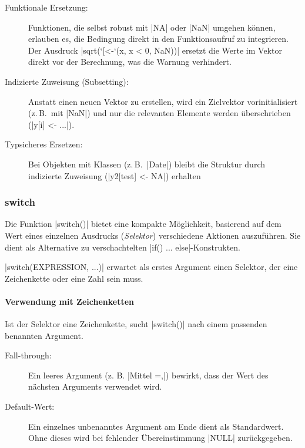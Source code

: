 \documentclass[10pt,twocolumn]{scrartcl}
\renewcommand{\lstinline}{\mycoloredinline}
\begin{document}
\begin{description}
\item[Funktionale Ersetzung:] Funktionen, die selbst robust mit \lstinline|NA| oder \lstinline|NaN| umgehen können, erlauben es, die Bedingung direkt in den Funktionsaufruf zu integrieren. Der Ausdruck \lstinline|sqrt(`[<-`(x, x < 0, NaN))| ersetzt die Werte im Vektor direkt vor der Berechnung, was die Warnung verhindert.
\item[Indizierte Zuweisung (Subsetting):] Anstatt einen neuen Vektor zu erstellen, wird ein Zielvektor vorinitialisiert (z.\,B.\ mit \lstinline|NaN|) und nur die relevanten Elemente werden überschrieben (\lstinline|y[i] <- ...|).
\item[Typsicheres Ersetzen:] Bei Objekten mit Klassen (z.\,B.\ \lstinline|Date|) bleibt die Struktur durch indizierte Zuweisung (\lstinline|y2[test] <- NA|) erhalten
\end{description}


\subsubsection{switch}

Die Funktion \lstinline|switch()| bietet eine kompakte Möglichkeit, basierend auf dem Wert eines einzelnen Ausdrucks (\emph{Selektor}) verschiedene Aktionen auszuführen. Sie dient als Alternative zu verschachtelten \lstinline|if() ... else|-Konstrukten.

\lstinline|switch(EXPRESSION, ...)| erwartet als erstes Argument einen Selektor, der eine Zeichenkette oder eine Zahl sein muss.

\paragraph{Verwendung mit Zeichenketten}

Ist der Selektor eine Zeichenkette, sucht \lstinline|switch()| nach einem passenden benannten Argument.

\begin{description}
\item[Fall-through:] Ein leeres Argument (z. B. \lstinline|Mittel =,|) bewirkt, dass der Wert des nächsten Arguments verwendet wird.
\item[Default-Wert:] Ein einzelnes unbenanntes Argument am Ende dient als Standardwert. Ohne dieses wird bei fehlender Übereinstimmung \lstinline|NULL| zurückgegeben.
\end{description}
\end{document}
